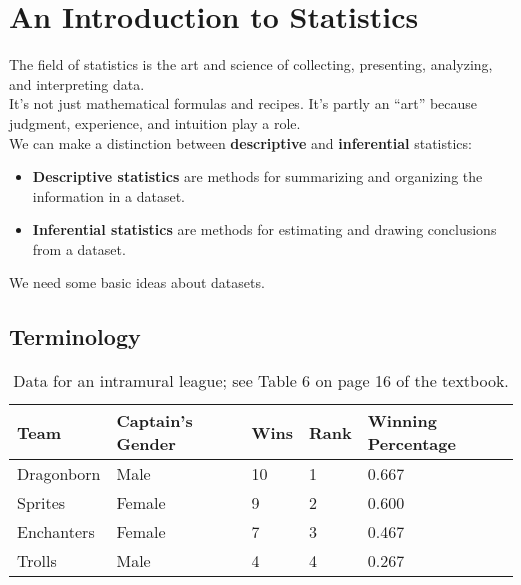 \documentclass[12pt,openany]{book}
\begin{document}
	\section{An Introduction to Statistics}

	The field of statistics is the art and science of collecting, presenting, analyzing, and interpreting data.\\

	\noindent It's not just mathematical formulas and recipes. It's partly an ``art'' because judgment, experience, and intuition play a role.\\
	
	\noindent We can make a distinction between \textbf{descriptive} and \textbf{inferential} statistics:
	
	\begin{itemize}
		\item{\textbf{Descriptive statistics} are methods for summarizing and organizing the information in a dataset.}
		\item{\textbf{Inferential statistics} are methods for estimating and drawing conclusions from a dataset.}
	\end{itemize}
	
	\noindent We need some basic ideas about datasets.

	\subsection{Terminology}

	\begin{table}[h!]
		\begin{center}
			\begin{tabular}{| l | l | l | l | l |}
				\hline
				\textbf{Team} & \textbf{Captain's Gender} & \textbf{Wins} & \textbf{Rank} & \textbf{Winning Percentage} \\
				\hline
				Dragonborn & Male & 10 & 1 & 0.667 \\
				\hline
				Sprites & Female & 9 & 2 & 0.600 \\
				\hline
				Enchanters & Female & 7 & 3 & 0.467 \\
				\hline
				Trolls & Male & 4 & 4 & 0.267 \\
				\hline
			\end{tabular}
			\caption{Data for an intramural league; see Table 6 on page 16 of the textbook.}
			\label{table:intramural}
		\end{center}
	\end{table}
\end{document}
